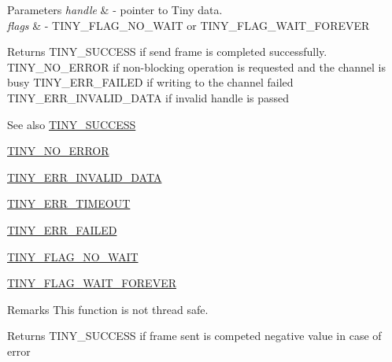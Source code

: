 \begin{DoxyParams}{Parameters}
{\em handle} & -\/ pointer to Tiny data. \\
\hline
{\em flags} & -\/ T\+I\+N\+Y\+\_\+\+F\+L\+A\+G\+\_\+\+N\+O\+\_\+\+W\+A\+I\+T or T\+I\+N\+Y\+\_\+\+F\+L\+A\+G\+\_\+\+W\+A\+I\+T\+\_\+\+F\+O\+R\+E\+V\+E\+R \\
\hline
\end{DoxyParams}
\begin{DoxyReturn}{Returns}
T\+I\+N\+Y\+\_\+\+S\+U\+C\+C\+E\+S\+S if send frame is completed successfully. T\+I\+N\+Y\+\_\+\+N\+O\+\_\+\+E\+R\+R\+O\+R if non-\/blocking operation is requested and the channel is busy T\+I\+N\+Y\+\_\+\+E\+R\+R\+\_\+\+F\+A\+I\+L\+E\+D if writing to the channel failed T\+I\+N\+Y\+\_\+\+E\+R\+R\+\_\+\+I\+N\+V\+A\+L\+I\+D\+\_\+\+D\+A\+T\+A if invalid handle is passed
\end{DoxyReturn}
\begin{DoxySeeAlso}{See also}
\hyperlink{group__ERROR__FLAGS_ga16cd043c890ed1fa381b3a20f75a626c}{T\+I\+N\+Y\+\_\+\+S\+U\+C\+C\+E\+S\+S} 

\hyperlink{group__ERROR__FLAGS_ga69c869a686b67bf0b7b8115599515d61}{T\+I\+N\+Y\+\_\+\+N\+O\+\_\+\+E\+R\+R\+O\+R} 

\hyperlink{group__ERROR__FLAGS_ga541a9e67a84e39595ad647d641c4df2e}{T\+I\+N\+Y\+\_\+\+E\+R\+R\+\_\+\+I\+N\+V\+A\+L\+I\+D\+\_\+\+D\+A\+T\+A} 

\hyperlink{group__ERROR__FLAGS_gac9ba8076a1eb8613e8d1f07629ff0cd1}{T\+I\+N\+Y\+\_\+\+E\+R\+R\+\_\+\+T\+I\+M\+E\+O\+U\+T} 

\hyperlink{group__ERROR__FLAGS_ga84e6ca143550038e1a71cf36078d1926}{T\+I\+N\+Y\+\_\+\+E\+R\+R\+\_\+\+F\+A\+I\+L\+E\+D} 

\hyperlink{group__FLAGS__GROUP_gadadd60eb21d7949e6d097ad36aab9b2e}{T\+I\+N\+Y\+\_\+\+F\+L\+A\+G\+\_\+\+N\+O\+\_\+\+W\+A\+I\+T} 

\hyperlink{group__FLAGS__GROUP_ga3a34267804581c5709d03f52d232b307}{T\+I\+N\+Y\+\_\+\+F\+L\+A\+G\+\_\+\+W\+A\+I\+T\+\_\+\+F\+O\+R\+E\+V\+E\+R} 
\end{DoxySeeAlso}
\begin{DoxyRemark}{Remarks}
This function is not thread safe.
\end{DoxyRemark}
Returns T\+I\+N\+Y\+\_\+\+S\+U\+C\+C\+E\+S\+S if frame sent is competed negative value in case of error \hypertarget{group__ADVANCED__API_ga159189fa29f3eaa79a76a3fa87b31084}{}
